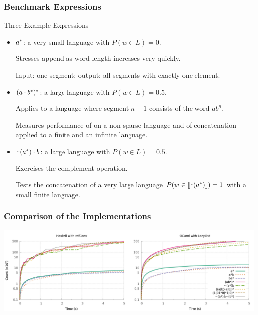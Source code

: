 \documentclass[pdftex,aspectratio=169]{beamer}
\begin{document}
\begin{frame}
  \frametitle{Benchmark Expressions}
  \vspace{-\baselineskip}
  \begin{block}{Three Example Expressions}
    \begin{itemize}
    \item $a^*$: a very small language with $P (w\in L) = 0$.
    
      Stresses append as word length increases very quickly.
    
      Input: one segment; output: all segments with exactly one element. 
    \item $(a \cdot{b^*})^*$: a large language
      with $P (w\in L)=0.5$.

      Applies  to a language where segment $n+1$ consists of the word $ab^n$.

      Measures performance of  on a non-sparse
      language and of {concatenation} applied to a finite and an infinite
      language.
    \item $\texttt{\textasciitilde}{(a^*)} \cdot{b}$: a large language with
      $P (w\in L) = 0.5$.
    
      Exercises the complement operation.

      Tests the concatenation of a very large language
      $P (w\in \llbracket\texttt{\textasciitilde}{(a^*)}\rrbracket) = 1$ with a small
      finite language.
    \end{itemize}
  \end{block}
\end{frame}
\begin{frame}
  \frametitle{Comparison of the Implementations}
  \begin{center}
    \includegraphics[scale=0.2]{../measure/langs.png}
  \end{center}
\end{frame}
\end{document}
